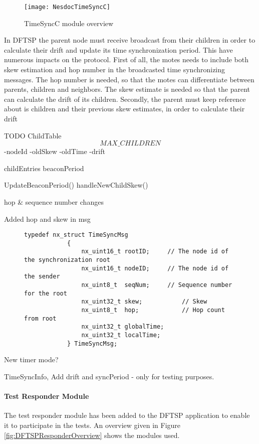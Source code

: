 \documentclass[Main]{subfiles}
\begin{document}
				\begin{figure}[H]
					\centering
					\texttt{[image: NesdocTimeSyncC]}
					\caption{TimeSyncC module overview}
					\label{fig:nesdoc_time_sync_c}
				\end{figure}

				In DFTSP the parent node must receive broadcast from their children in order to calculate their drift and update its time synchronization period.
				This have numerous impacts on the protocol.
				First of all, the motes needs to include both skew estimation and hop number in the broadcasted time synchronizing messages. 
				The hop number is needed, so that the motes can differentiate between parents, children and neighbors. 
				The skew estimate is needed so that the parent can calculate the drift of its children.
				Secondly, the parent must keep reference about is children and their previous skew estimates, in order to calculate their drift


				TODO
			ChildTable\[MAX\_CHILDREN\]
			-nodeId
			-oldSkew
			-oldTime
			-drift

			childEntries
			beaconPeriod

			UpdateBeaconPeriod()
			handleNewChildSkew()

			hop \& sequence number changes

			Added hop and skew in msg
			\begin{figure}[H]
				\begin{lstlisting}[caption=TimeSyncMsg, style=Code-C, label=lst:time_sync_msg]
			typedef nx_struct TimeSyncMsg
			{
				nx_uint16_t	rootID;		// The node id of the synchronization root
				nx_uint16_t	nodeID;		// The node id of the sender
				nx_uint8_t	seqNum;		// Sequence number for the root
				nx_uint32_t skew;			// Skew 
				nx_uint8_t  hop;			// Hop count from root
				nx_uint32_t	globalTime;
				nx_uint32_t localTime;
			} TimeSyncMsg;
				\end{lstlisting}
			\end{figure}

			New timer mode?


			TimeSyncInfo, Add drift and syncPeriod - only for testing purposes.



			

			
			
			\paragraph{Test Responder Module} %
			\label{par:test_responder_module}
				The test responder module has been added to the DFTSP application to enable it to participate in the tests.
				An overview given in Figure \ref{fig:DFTSPResponderOverview} shows the modules used.
\end{document}
